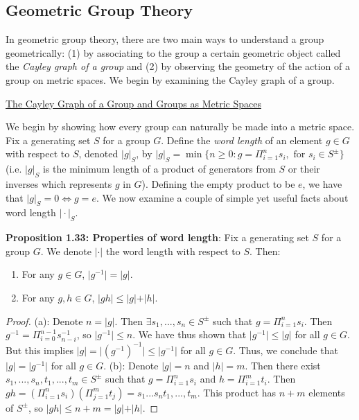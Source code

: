 \documentclass[12pt]{article}
\newcommand{\vs}{\vskip10pt}
\begin{document}
		
		\newpage
	\subsection{Geometric Group Theory}
	
	In geometric group theory, there are two main ways to understand a group geometrically: (1) by associating to the group a certain geometric object called the \textit{Cayley graph of a group} and (2) by observing the geometry of the action of a group on metric spaces. We begin by examining the Cayley graph of a group. 
	
	\vs 
	
	\underline{The Cayley Graph of a Group and Groups as Metric Spaces}
	
	\vs 
	
	We begin by showing how every group can naturally be made into a metric space. Fix a generating set $S$ for a group $G$. Define the \textit{word length} of an element $g \in G$ with respect to $S$, denoted $\vert g \vert_S$, by $\vert g \vert_S = \min \{n \geq 0: g = \Pi_{i=1}^n s_i, \text{ for } s_i \in S^{\pm}\}$ (i.e. $\vert g \vert_S$ is the minimum length of a product of generators from $S$ or their inverses which represents $g$ in $G$). Defining the empty product to be $e$, we have that $\vert g \vert_S = 0 \iff g = e$. We now examine a couple of simple yet useful facts about word length $\vert \cdot \vert_S$. 
	
		\vs 
	
	\textbf{Proposition 1.33: Properties of word length}: Fix a generating set $S$ for a group $G$. We denote $\vert \cdot \vert$ the word length with respect to $S$. Then: 
	
	\begin{enumerate}[label = (\alph*)]
		\item For any $g \in G$, $\vert g^{-1} \vert = \vert g \vert$. 
		\item For any $g,h \in G$, $\vert gh \vert \leq \vert g \vert + \vert h \vert$.
	\end{enumerate}
	
	\begin{proof}
		
		(a): Denote $n = \vert g \vert$. Then $\exists s_1,...,s_n \in S^{\pm}$ such that $g = \Pi_{i=1}^n s_i$. Then $g^{-1} = \Pi_{i=0}^{n-1} s_{n-i}^{-1}$, so $\vert g^{-1} \vert \leq n$. We have thus shown that $\vert g^{-1} \vert \leq \vert g \vert$ for all $g \in G$. But this implies $\vert g \vert = \vert (g^{-1})^{-1} \vert \leq \vert g^{-1} \vert$ for all $g \in G$. Thus, we conclude that $\vert g \vert = \vert g^{-1} \vert$ for all $g \in G$. 
		\vs 
		(b): Denote $\vert g \vert = n$ and $\vert h \vert = m$. Then there exist $s_1,...,s_n,t_1,...,t_m \in S^{\pm}$ such that $g = \Pi_{i=1}^n s_i$ and $h = \Pi_{i=1}^m t_i$. Then $gh = (\Pi_{i=1}^n s_i)(\Pi_{j=1}^m t_j) = s_1...s_nt_1,...,t_m$. This product has $n+m$ elements of $S^{\pm}$, so $\vert gh \vert \leq n + m = \vert g \vert + \vert h \vert$.
		
	\end{proof}
	
\end{document}
